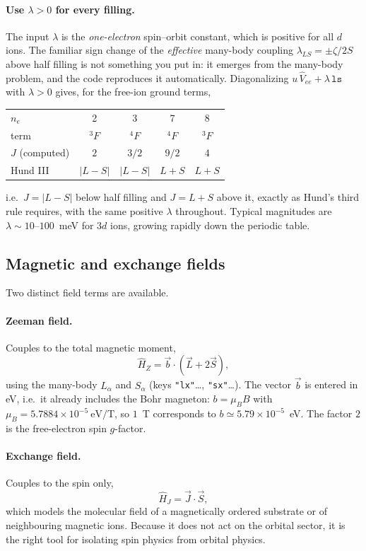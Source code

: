 \documentclass[11pt,a4paper]{article}
\newcommand{\op}[1]{\texttt{#1}}
\begin{document}
\paragraph{Use $\lambda>0$ for every filling.}
The input $\lambda$ is the \emph{one-electron} spin--orbit constant, which is
positive for all $d$ ions.  The familiar sign change of the \emph{effective}
many-body coupling $\lambda_{LS}=\pm\zeta/2S$ above half filling is not
something you put in: it emerges from the many-body problem, and the code
reproduces it automatically.  Diagonalizing $u\,\hat V_{ee}+\lambda\,\op{ls}$
with $\lambda>0$ gives, for the free-ion ground terms,
\begin{center}
\begin{tabular}{lcccc}
\toprule
$n_e$ & 2 & 3 & 7 & 8\\
term  & $^3F$ & $^4F$ & $^4F$ & $^3F$\\
$J$ (computed) & $2$ & $3/2$ & $9/2$ & $4$\\
Hund III & $|L{-}S|$ & $|L{-}S|$ & $L{+}S$ & $L{+}S$\\
\bottomrule
\end{tabular}
\end{center}
i.e.\ $J=|L-S|$ below half filling and $J=L+S$ above it, exactly as Hund's third
rule requires, with the same positive $\lambda$ throughout.  Typical magnitudes
are $\lambda\sim 10$--$100$~meV for $3d$ ions, growing rapidly down the periodic
table.

\subsection{Magnetic and exchange fields}

Two distinct field terms are available.

\paragraph{Zeeman field.}  Couples to the total magnetic moment,
\begin{equation}
  \hat H_{Z} = \vec{b}\cdot(\vec{L}+2\vec{S}),
\end{equation}
using the many-body $L_\alpha$ and $S_\alpha$ (keys \op{"lx"}\ldots,
\op{"sx"}\ldots).  The vector $\vec{b}$ is entered in eV, i.e.\ it already
includes the Bohr magneton: $b = \mu_B B$ with
$\mu_B=5.7884\times 10^{-5}\ \mathrm{eV/T}$, so $1$~T corresponds to
$b\simeq 5.79\times 10^{-5}$~eV.  The factor $2$ is the free-electron spin
$g$-factor.

\paragraph{Exchange field.}  Couples to the spin only,
\begin{equation}
  \hat H_{J} = \vec{J}\cdot\vec{S},
\end{equation}
which models the molecular field of a magnetically ordered substrate or of
neighbouring magnetic ions.  Because it does not act on the orbital sector, it
is the right tool for isolating spin physics from orbital physics.
\end{document}
